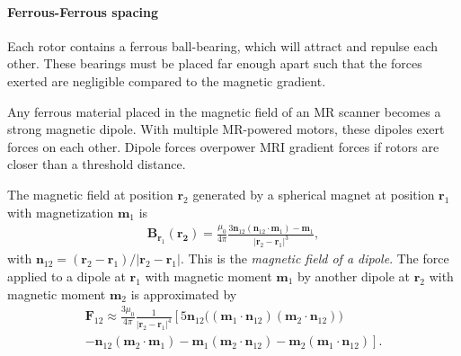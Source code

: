 \documentclass[letterpaper, 10 pt]{IEEEtran}
\begin{document}
\paragraph{Ferrous-Ferrous spacing}
 Each rotor contains a ferrous ball-bearing, which will attract and repulse each other.  These bearings must be placed far enough apart such that the forces exerted are negligible compared to the magnetic gradient.
 
 Any ferrous material placed in the magnetic field of an MR scanner becomes a strong magnetic dipole.  With multiple MR-powered motors, these dipoles exert forces on each other.  Dipole forces overpower MRI gradient forces if rotors are closer than a threshold distance.

The magnetic field at position $\mathbf{r}_2$ generated by a spherical magnet at position $\mathbf{r}_1$ with magnetization  $\mathbf{m}_1$ is  \cite{Schill2003} %
\begin{align}
\label{eq:dipoleMagField}
 \mathbf{B}_{\mathbf{r}_1}(\mathbf{r_2}) = \frac{\mu_0}{4 \pi}\frac{3 \mathbf{n}_{12}(\mathbf{n}_{12} \cdot \mathbf{m}_1) - \mathbf{m}_1}
 {|\mathbf{r}_2-\mathbf{r}_1|^3},
\end{align}
with  $\mathbf{n}_{12} = (\mathbf{r}_2-\mathbf{r}_1)/|\mathbf{r}_2-\mathbf{r}_1|$. This is the \emph{magnetic field of a dipole}.
 The force applied to a dipole at $\mathbf{r}_1$ with magnetic moment $\mathbf{m}_1$ by another dipole at $\mathbf{r}_2$ with magnetic moment $\mathbf{m}_2$ is approximated by
\begin{align}
\mathbf{F}_{12} \approx \frac{3\mu_0}{4 \pi} \frac{1}{|\mathbf{r}_2 - \mathbf{r}_1 |^4}
\left[5 \mathbf{n}_{12}\Big(\left(\mathbf{m}_1 \cdot \mathbf{n}_{12} \right)   \left(\mathbf{m}_2 \cdot \mathbf{n}_{12} \right) \Big) \right. \nonumber \\
\left.
-  \mathbf{n}_{12} \left(\mathbf{m}_2 \cdot \mathbf{m}_1 \right)
-  \mathbf{m}_{1} \left(\mathbf{m}_2 \cdot \mathbf{n}_{12} \right)  -  \mathbf{m}_{2} \left(\mathbf{m}_1 \cdot \mathbf{n}_{12}\right)   \right].\nonumber
\label{eq:dipoleForce}
\end{align}
\end{document}
